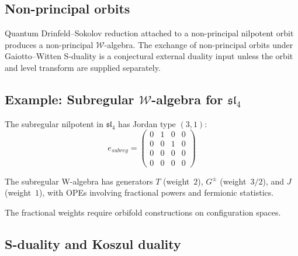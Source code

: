 \subsection{Non-principal orbits}

Quantum Drinfeld--Sokolov reduction attached to a non-principal
nilpotent orbit produces a non-principal $\mathcal W$-algebra.  The
exchange of non-principal orbits under Gaiotto--Witten S-duality is
a conjectural external duality input unless the orbit and level
transform are supplied separately.

\subsection{\texorpdfstring{Example: Subregular $\mathcal{W}$-algebra for $\mathfrak{sl}_4$}{Example: Subregular $\mathcal{W}$-algebra for sl 4}}

\begin{definition}
The subregular nilpotent in $\mathfrak{sl}_4$ has Jordan type $(3,1)$:
\[
e_{subreg} = \begin{pmatrix} 0 & 1 & 0 & 0 \\ 0 & 0 & 1 & 0 \\ 0 & 0 & 0 & 0 \\ 0 & 0 & 0 & 0 \end{pmatrix}
\]
\end{definition}

\begin{theorem}\label{thm:w-algebra-sl4}
The subregular W-algebra has generators $T$ (weight~$2$), $G^{\pm}$ (weight~$3/2$), and $J$ (weight~$1$), with OPEs involving fractional powers and fermionic statistics.
\end{theorem}

The fractional weights require orbifold constructions on configuration spaces.

\subsection{S-duality and Koszul duality}

